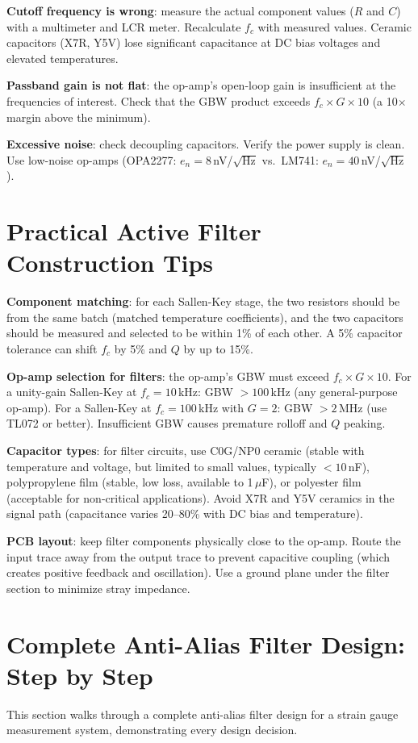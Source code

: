 \documentclass[11pt,letterpaper,twoside,openany]{book}
\begin{document}
\textbf{Cutoff frequency is wrong}: measure the actual component values ($R$ and $C$) with a multimeter and LCR meter. Recalculate $f_c$ with measured values. Ceramic capacitors (X7R, Y5V) lose significant capacitance at DC bias voltages and elevated temperatures.

\textbf{Passband gain is not flat}: the op-amp's open-loop gain is insufficient at the frequencies of interest. Check that the GBW product exceeds $f_c \times G \times 10$ (a 10$\times$ margin above the minimum).

\textbf{Excessive noise}: check decoupling capacitors. Verify the power supply is clean. Use low-noise op-amps (OPA2277: $e_n = 8$\,nV/$\sqrt{\text{Hz}}$ vs.\ LM741: $e_n = 40$\,nV/$\sqrt{\text{Hz}}$).
\section{Practical Active Filter Construction Tips}
\textbf{Component matching}: for each Sallen-Key stage, the two resistors should be from the same batch (matched temperature coefficients), and the two capacitors should be measured and selected to be within 1\% of each other. A 5\% capacitor tolerance can shift $f_c$ by 5\% and $Q$ by up to 15\%.

\textbf{Op-amp selection for filters}: the op-amp's GBW must exceed $f_c \times G \times 10$. For a unity-gain Sallen-Key at $f_c = 10$\,kHz: GBW $> 100$\,kHz (any general-purpose op-amp). For a Sallen-Key at $f_c = 100$\,kHz with $G = 2$: GBW $> 2$\,MHz (use TL072 or better). Insufficient GBW causes premature rolloff and $Q$ peaking.

\textbf{Capacitor types}: for filter circuits, use C0G/NP0 ceramic (stable with temperature and voltage, but limited to small values, typically $< 10$\,nF), polypropylene film (stable, low loss, available to 1\,$\mu$F), or polyester film (acceptable for non-critical applications). Avoid X7R and Y5V ceramics in the signal path (capacitance varies 20--80\% with DC bias and temperature).

\textbf{PCB layout}: keep filter components physically close to the op-amp. Route the input trace away from the output trace to prevent capacitive coupling (which creates positive feedback and oscillation). Use a ground plane under the filter section to minimize stray impedance.
\section{Complete Anti-Alias Filter Design: Step by Step}
This section walks through a complete anti-alias filter design for a strain gauge measurement system, demonstrating every design decision.
\end{document}
